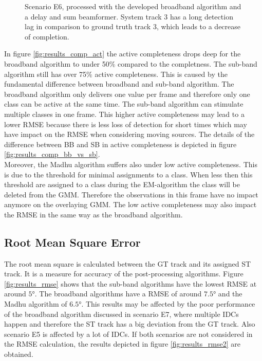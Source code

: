 \begin{figure}[!ht]
	\centering
		\def\svgwidth{1\linewidth}
		  \small
		\caption{Scenario E6, processed with the developed broadband algorithm and a delay and sum beamformer. System track 3 has a long detection lag in comparison to ground truth track 3, which leads to a decrease of completion.}
		\label{fig:results_comp_ex1}
\end{figure}
In figure \ref{fig:results_comp_act} the active completeness drops deep for the broadband algorithm to under 50\% compared to the completness.
The sub-band algorithm still has over 75\% active completeness. This is caused by the fundamental difference between broadband and sub-band algorithm. The broadband algorithm only delivers one value per frame and therefore only one class can be active at the same time. The sub-band algorithm can stimulate multiple classes in one frame. This higher active completeness may lead to a lower \ac{RMSE} because there is less loss of detection for short times which may have impact on the \ac{RMSE} when considering moving sources. The details of the difference between BB and SB in active completeness is depicted in figure \ref{fig:results_comp_bb_vs_sb}.\\
Moreover, the Madhu algorithm suffers also under low active completeness. This is due to the threshold for minimal assignments to a class. When less then this threshold are assigned to a class during the EM-algorithm the class will be deleted from the \ac{GMM}. Therefore the observations in this frame have no impact anymore on the overlaying \ac{GMM}. The low active completeness may also impact the \ac{RMSE} in the same way as the broadband algorithm.


\subsection{Root Mean Square Error}

The root mean square is calculated between the \ac{GT} track and its assigned \ac{ST} track. It is a measure for accuracy of the post-processing algorithms. Figure \ref{fig:results_rmse} shows that the sub-band algorithms have the lowest \ac{RMSE} at around $\ang{5}$. The broadband algorithms have a \ac{RMSE} of around $\ang{7.5}$ and the Madhu algorithm of $\ang{6.5}$. This results may be affected by the poor performance of the broadband algorithm discussed in scenario E7, where multiple \acp{IDC} happen and therefore the \ac{ST} track has a big deviation from the \ac{GT} track. Also scenario E5 is affected by a lot of \acp{IDC}. If both scenarios are not considered in the \ac{RMSE} calculation, the results depicted in figure \ref{fig:results_rmse2} are obtained.

